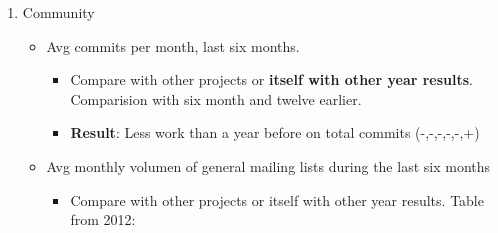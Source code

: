 \documentclass[11pt]{scrartcl}
\begin{document}
\begin{enumerate}
\begin{itemize}
	    \item Documentation
    	    \begin{itemize}
                \item Online tutorials - Development
                \item Offline tutorials - SVNBook\footnote{http://svnbook.red-bean.com/}
                \item Hello World - Tutorial to initialize a Repository in 10 minutes.
                \item Books from the author, authors or company -  SVNBook
                \item Languages - Various Languages (Deutsch | English | French | Spanish | Italian | Japanese | Norwegian | Portuguese | Russian | Chinese)
            \end{itemize}
    \end{itemize}

    \item Community
    \begin{itemize}
	    \item Avg commits per month, last six months.
	        \begin{itemize}
                \item Compare with other projects or \textbf{itself with other year results}. Comparision with six month and twelve earlier.
                \item \textbf{Result}: Less work than a year before on total commits (-,-,-,-,-,+)
            \end{itemize}
	    \item Avg monthly volumen of general mailing lists during the last six months
	    \begin{itemize}
            \item Compare with other projects or itself with other year results. Table from 2012:


\end{itemize}
\end{itemize}
\end{enumerate}
\end{document}
